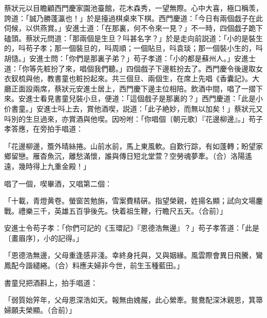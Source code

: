 蔡狀元以目瞻顧西門慶家園池臺館，花木森秀，一望無際。心中大喜，極口稱羡，誇道：「誠乃勝蓬瀛也！」於是擡過棋桌來下棋。西門慶道：「今日有兩個戯子在此伺候，以供燕賞。」安進士道：「在那裏，何不令來一見？」不一時，四個戯子跪下磕頭。蔡狀元問道：「那兩個是生旦？呌甚名字？」於是走向前説道：「小的是裝生的，呌苟子孝；那一個裝旦的，呌周順；一個貼旦，呌袁琰；那一個裝小生的，呌胡慥。」安進士問：「你們是那裏子弟？」苟子孝道：「小的都是蘇州人。」安進士道：「你等先粧扮了來，唱個我們聽。」四個戲子下邊粧扮去了。西門慶令後邊取女衣釵梳與他，教書童也粧扮起來。共三個旦、兩個生，在席上先唱《香囊記》。大廳正面設兩席，蔡狀元安進士居上，西門慶下邊主位相陪。飲酒中間，唱了一摺下來。安進士看見書童兒裝小旦，便道：「這個戲子是那裏的？」西門慶道：「此是小价書童。」安進士呌上去，賞他酒喫，説道：「此子絶妙，而無以加矣！」蔡狀元又呌別的生旦過來，亦賞酒與他喫。因吩咐：「你唱個〔朝元歌〕『花邊柳邊』。」苟子孝答應，在旁拍手唱道：

\begin{myquote}
「花邊柳邊，簷外晴絲捲。山前水前，馬上東風軟。自歎行踪，有如蓬轉；盼望家鄉留戀。雁杳魚沉，離愁滿懷，誰與傳日短北堂萱？空勞魂夢牽。{\marktext\small（合）}洛陽遙遠，幾時得上九重金殿！」
\end{myquote}

唱了一個，喫畢酒，又唱第二個：

\begin{myquote}
「十載，青燈黄卷。螢窗苦勉旃，雪案費精硏。指望榮親，姓揚名顯；試向文場鏖戰。禮樂三千，英雄五百爭後先。快着祖生鞭，行瞻尺五天。{\marktext\small（合前）}」
\end{myquote}

安進士令苟子孝：「你們可記的《玉環記》『恩德浩無邊』？」苟子孝答道：「此是〔畫眉序〕，小的記得。」

\begin{myquote}
「恩德浩無邊，父母重逢感非淺。幸終身托與，又與姻緣。風雲際會異日飛騰，鸞鳳配今諧繾綣。{\marktext\small（合）}料應夫婦非今世，前生玉種藍田。」
\end{myquote}

書童兒把酒斟上，拍手唱道：

\begin{myquote}
「弱質始笄年，父母恩深浩如天。報無由媿赧，此心縈牽。鴛鴦配深沐親恩，箕箒婦願夫榮顯。{\marktext\small（合前）}」
\end{myquote}

